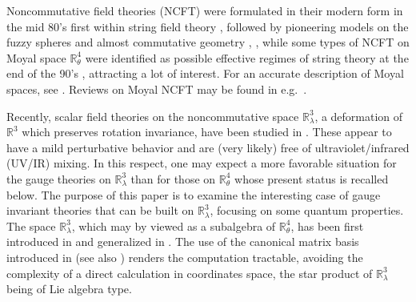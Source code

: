 \documentclass[a4paper,11pt]{article}
\numberwithin{equation}{section}
\theoremstyle{nonumberplain}
\begin{document}
Noncommutative field theories 
(NCFT) 
were formulated in  their modern form in the mid 80's first within string field theory \cite{witt1}, followed by pioneering models on the fuzzy spheres and almost commutative geometry \cite{DKM}, \cite{fuzzy1}, while some types of NCFT on Moyal space $\mathbb{R}^4_\theta$ were identified as possible effective regimes of string theory at the end of the 90's \cite{Schomerus}, attracting a lot of interest. For an accurate description of Moyal spaces, see \cite{pepejoe}.  Reviews on Moyal NCFT may be found in e.g.~\cite{Szabo:2001}.\par

Recently, scalar field theories on the noncommutative space $\mathbb{R}^3_\lambda$, a deformation of $\mathbb{R}^3$ which preserves rotation invariance, have been studied in \cite{vit-wal-12}. These appear  to have a mild perturbative behavior and are (very likely) free of ultraviolet/infrared (UV/IR) mixing. In this respect, one may expect a more favorable situation for the gauge theories on $\mathbb{R}^3_\lambda$ than for those on $\mathbb{R}^4_\theta$ whose present status is recalled below. The purpose of this paper is to examine the interesting case of gauge invariant theories that can be built on $\mathbb{R}^3_\lambda$, focusing on some quantum properties. The space $\mathbb{R}^3_\lambda$, which may by viewed as a subalgebra of $\mathbb{R}^4_\theta$,  has been first introduced in \cite{Hammaa} and generalized in \cite{selene}. The use of the canonical matrix basis introduced in \cite{vit-wal-12} (see also \cite{duflo}) renders the computation tractable, avoiding the complexity of a direct calculation in coordinates space, the star product of $\mathbb{R}^3_\lambda$ being of Lie algebra type.\par
\end{document}
